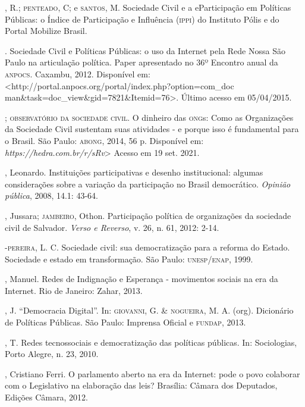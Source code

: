 \begin{bibliohedra}
, R.; \textsc{penteado}, C; e \textsc{santos}, M. Sociedade Civil e a eParticipação
em Políticas Públicas: o Índice de Participação e Influência (\textsc{ippi}) do
Instituto Pólis e do Portal Mobilize Brasil.

\titidem.
Sociedade Civil e Políticas Públicas: o uso da Internet pela Rede Nossa
São Paulo na articulação política. Paper apresentado no 36º Encontro
anual da \textsc{anpocs}. Caxambu, 2012. Disponível em:
\textless{}http://portal.anpocs.org/portal/index.php?option=com\_doc %
man\&task=doc\_view\&gid=7821\&Itemid=76\textgreater{}. Último acesso em
05/04/2015.

; \textsc{observatório
da sociedade civil}. O dinheiro das \textsc{ong}s: Como as Organizações da
Sociedade Civil sustentam suas atividades - e porque isso é fundamental
para o Brasil. São Paulo: \textsc{abong}, 2014, 56 p. Disponível em:
\emph{https://hedra.com.br/r/sRv}>
Acesso em 19 set. 2021.

, Leonardo. Instituições participativas e desenho institucional:
algumas considerações sobre a variação da participação no Brasil
democrático. \emph{Opinião pública}, 2008, 14.1: 43-64.

, Jussara; \textsc{jambeiro}, Othon. Participação política de organizações
da sociedade civil de Salvador. \emph{Verso e Reverso}, v. 26, n. 61,
2012: 2-14.

-\textsc{pereira}, L. C. Sociedade civil: sua democratização para a
reforma do Estado. Sociedade e estado em transformação. São Paulo:
\textsc{unesp}/\textsc{enap}, 1999.

, Manuel. Redes de Indignação e Esperança - movimentos sociais
na era da Internet. Rio de Janeiro: Zahar, 2013.

, J. ``Democracia Digital''. In: \textsc{giovanni}, G. \& \textsc{nogueira}, M. A.
(org). Dicionário de Políticas Públicas. São Paulo: Imprensa Oficial e
\textsc{fundap}, 2013.

, T. Redes tecnossociais e democratização das políticas públicas.
In: Sociologias, Porto Alegre, n. 23, 2010.

, Cristiano Ferri. O parlamento aberto na era da Internet: pode o
povo colaborar com o Legislativo na elaboração das leis? Brasília:
Câmara dos Deputados, Edições Câmara, 2012.


\end{bibliohedra}

